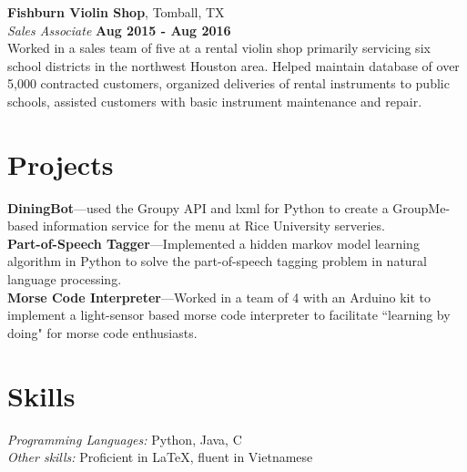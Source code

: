 \documentclass[margin,line]{resume}
\begin{document}
\begin{resume}
    \textbf{Fishburn Violin Shop}, Tomball, TX \vspace{2mm}\\\vspace{1mm}%
    \textsl{Sales Associate} \hfill \textbf{Aug 2015 -
    Aug 2016}\\
    Worked in a sales team of five at a rental violin shop primarily servicing six school districts in the northwest Houston area.
    Helped maintain database of over 5,000 contracted customers, organized deliveries of rental instruments to public schools, assisted customers with basic instrument maintenance and repair.
\vspace{1mm}%

   \section{\mysidestyle Projects}
   \textbf{DiningBot}---used the Groupy API and lxml for Python to create a GroupMe-based information service for the menu at Rice University serveries.\vspace{1mm}\\
   \textbf{Part-of-Speech Tagger}---Implemented a hidden markov model learning algorithm in Python to solve the part-of-speech tagging problem in natural language processing.\vspace{1mm}\\
   \textbf{Morse Code Interpreter}---Worked in a team of 4 with an Arduino kit to implement a light-sensor based morse code interpreter to facilitate ``learning by doing" for morse code enthusiasts.
\vspace{1mm}%

\section{\mysidestyle Skills}

\emph{Programming Languages:} Python, Java, C \\
\emph{Other skills:} Proficient in \LaTeX, fluent in Vietnamese



\end{resume}
\end{document}
